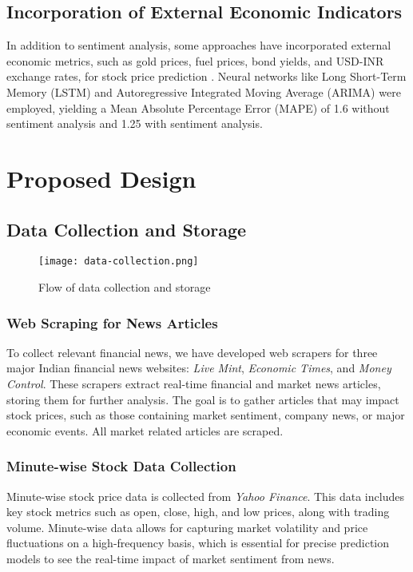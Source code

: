 \documentclass[conference]{IEEEtran}
\begin{document}
\subsection{Incorporation of External Economic Indicators}
In addition to sentiment analysis, some approaches have incorporated external economic metrics, such as gold prices, fuel prices, bond yields, and USD-INR exchange rates, for stock price prediction \cite{stockprice2021}. Neural networks like Long Short-Term Memory (LSTM) and Autoregressive Integrated Moving Average (ARIMA) were employed, yielding a Mean Absolute Percentage Error (MAPE) of 1.6 without sentiment analysis and 1.25 with sentiment analysis.

\section{Proposed Design}
\subsection{Data Collection and Storage}
\begin{figure}
    \centering
    \texttt{[image: data-collection.png]}
    \caption{Flow of data collection and storage}
    \label{fig:data-collection}
\end{figure}
\subsubsection{Web Scraping for News Articles}
To collect relevant financial news, we have developed web scrapers for three major Indian financial news websites: \textit{Live Mint}, \textit{Economic Times}, and \textit{Money Control}. These scrapers extract real-time financial and market news articles, storing them for further analysis. The goal is to gather articles that may impact stock prices, such as those containing market sentiment, company news, or major economic events. All market related articles are scraped.

\subsubsection{Minute-wise Stock Data Collection}
Minute-wise stock price data is collected from \textit{Yahoo Finance}. This data includes key stock metrics such as open, close, high, and low prices, along with trading volume. Minute-wise data allows for capturing market volatility and price fluctuations on a high-frequency basis, which is essential for precise prediction models to see the real-time impact of market sentiment from news.
\end{document}
